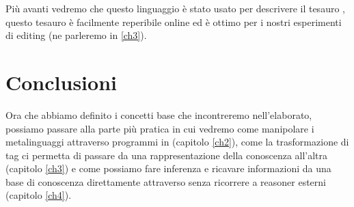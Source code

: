Più avanti vedremo che questo linguaggio è stato usato per descrivere il tesauro , questo tesauro è facilmente reperibile online ed è ottimo per i nostri esperimenti di editing (ne parleremo in \ref{ch3}).
\section{Conclusioni}
Ora che abbiamo definito i concetti base che incontreremo nell'elaborato, possiamo passare alla parte più pratica in cui vedremo come manipolare i metalinguaggi attraverso programmi in \cduce (capitolo \ref{ch2}), come la trasformazione di tag ci permetta di passare da una rappresentazione della conoscenza all'altra (capitolo \ref{ch3}) e come possiamo fare inferenza e ricavare informazioni da una base di conoscenza direttamente attraverso \cduce senza ricorrere a reasoner esterni (capitolo \ref{ch4}).
